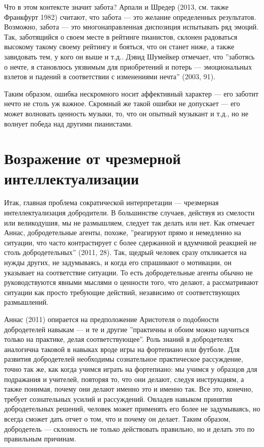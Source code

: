 \documentclass[11pt]{book}
\begin{document}
Что в этом контексте значит забота? Арпали и Шредер (2013, см. также Франкфурт 1982) считают, что забота --- это желание определенных результатов. Возможно, забота --- это многонаправленная диспозиция испытывать ряд эмоций. Так, заботящийся о своем месте в рейтинге пианистов, склонен радоваться высокому такому своему рейтингу и бояться, что он станет ниже, а также завидовать тем, у кого он выше и т.д.. Дэвид Шумейкер отмечает, что ''заботясь о нечте, я становлюсь уязвимым для приобретений и потерь --- эмоциональных взлетов и падений в соответствии с изменениями нечта'' (2003, 91).

Таким образом, ошибка нескромного носит аффективный характер --- его заботит нечто не столь уж важное. Скромный же такой ошибки не допускает --- его может волновать ценность музыки, то, что он опытный музыкант и т.д., но не волнует победа над другими пианистами.

\section{Возражение от чрезмерной интеллектуализации}

Итак, главная проблема сократической интерпретации --- чрезмерная интеллектуализация добродители. В большинстве случаев, действуя из смелости или великодушия, мы не размышляем, следует так делать или нет. Как отмечает Аннас, добродетельные агенты, похоже, ''реагируют прямо и немедленно на ситуации, что часто контрастирует с более сдержанной и вдумчивой реакцией не столь добродетельных'' (2011, 28). Так, щедрый человек сразу откликается на нужды других, не задумываясь, и когда его спрашивают о мотивации, он указывает на соответствие ситуации. То есть добродетельные агенты обычно не руководствуются явными мыслями о ценности того, что делают, а рассматривают ситуации как просто требующие действий, независимо от соответствующих размышлений.

Аннас (2011) опирается на предположение Аристотеля о подобности добродетелей навыкам --- и те и другие ''практичны и обоим можно научиться только на практике, делая соответствующее''. Роль знаний в добродетелях аналогична таковой в навыках вроде игры на фортепиано или футболе. Для развития добродетелей необходимы сознательное практическое рассуждение, точно так же, как когда учимся играть на фортепиано: мы учимся у образцов для подражания и учителей, повторяя то, что они делают, следуя инструкциям, а также понимая, почему они делают именно это и именно так. Все это, конечно, требует сознательных усилий и рассуждений. Овладев навыком принятия добродетельных решений, человек может применять его более не задумываясь, но всегда сможет дать отчет о том, что и почему он делает. Таким образом, добродетель --- склонность не только действовать правильно, но и делать это по правильным причинам.
\end{document}
